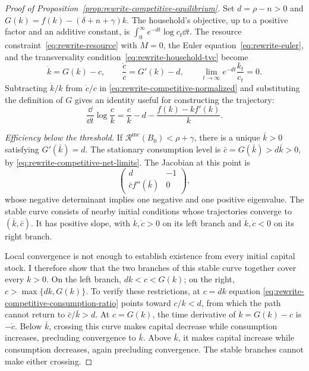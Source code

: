 \begin{proof}[Proof of Proposition~\ref{prop:rewrite-competitive-equilibrium}]
Set $d=\rho-n>0$ and $G(k)=f(k)-(\delta+n+\gamma)k$.
The household's objective, up to a positive factor and an additive
constant, is $\int_0^\infty e^{-dt}\log c_t\dd t$.
The resource constraint~\eqref{eq:rewrite-resource} with $M=0$,
the Euler equation~\eqref{eq:rewrite-euler}, and the transversality
condition~\eqref{eq:rewrite-household-tvc} become
\begin{equation}
 \dot k=G(k)-c,\qquad
 \frac{\dot c}{c}=G'(k)-d,\qquad
 \lim_{t\to\infty}e^{-dt}\frac{k_t}{c_t}=0.
 \label{eq:rewrite-competitive-normalized}
\end{equation}
Subtracting $\dot k/k$ from $\dot c/c$ in
\eqref{eq:rewrite-competitive-normalized} and substituting the definition
of $G$ gives an identity useful for constructing the trajectory:
\begin{equation}
 \frac{\dd}{\dd t}\log\frac ck
 =\frac ck-d-\frac{f(k)-kf'(k)}k.
 \label{eq:rewrite-competitive-consumption-ratio}
\end{equation}

\emph{Efficiency below the threshold.}
If $\mathcal R^{\mathrm{mc}}(B_0)<\rho+\gamma$, there is a unique
$\bar k>0$ satisfying $G'(\bar k)=d$. The stationary consumption
level is $\bar c=G(\bar k)>d\bar k>0$, by
\eqref{eq:rewrite-competitive-net-limits}. The Jacobian at this point is
\[
 \begin{pmatrix}d&-1\\ \bar c f''(\bar k)&0\end{pmatrix},
\]
whose negative determinant implies one negative and one positive eigenvalue.
The stable curve consists of nearby initial conditions whose trajectories
converge to $(\bar k,\bar c)$. It has positive slope,
with $\dot k,\dot c>0$ on its left branch and
$\dot k,\dot c<0$ on its right branch.

Local convergence is not enough to establish existence from every
initial capital stock. I therefore show that the two branches of this
stable curve together cover every $k>0$. On the left branch,
$dk<c<G(k)$; on the right, $c>\max\{dk,G(k)\}$.
To verify these restrictions, at $c=dk$ equation
\eqref{eq:rewrite-competitive-consumption-ratio} points toward
$c/k<d$, from which the path cannot return to $\bar c/\bar k>d$.
At $c=G(k)$, the time derivative of $\dot k=G(k)-c$ is
$-\dot c$. Below $\bar k$, crossing this curve makes capital decrease
while consumption increases, precluding convergence to $\bar k$.
Above $\bar k$, it makes capital increase while consumption decreases,
again precluding convergence. The stable branches cannot make either
crossing.


\end{proof}
